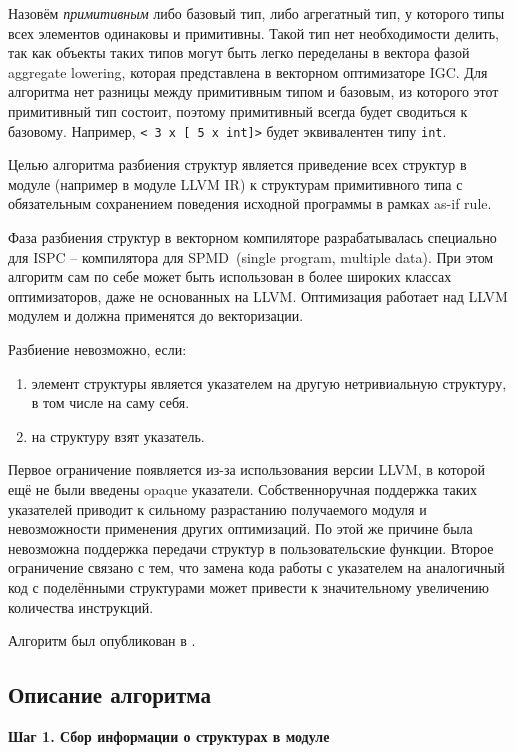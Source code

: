 Назовём \emph{примитивным} либо базовый тип, либо агрегатный тип, у которого типы всех элементов одинаковы и примитивны. Такой тип нет необходимости делить, так как объекты таких типов могут быть легко переделаны в вектора фазой aggregate lowering, которая представлена в векторном оптимизаторе IGC. Для алгоритма нет разницы между примитивным типом и базовым, из которого этот примитивный тип состоит, поэтому примитивный всегда будет сводиться к базовому. Например, \verb|< 3 x [ 5 x int]>| будет эквивалентен типу \verb|int|.

Целью алгоритма разбиения структур является приведение всех структур в модуле (например в модуле LLVM IR) к структурам примитивного типа с обязательным сохранением поведения исходной программы в рамках as-if rule.

Фаза разбиения структур в векторном компиляторе разрабатывалась специально для ISPC -- компилятора для SPMD~(single program, multiple data). При этом алгоритм сам по себе может быть использован в более широких классах оптимизаторов, даже не основанных на LLVM. Оптимизация работает над LLVM модулем и должна применятся до векторизации.

Разбиение невозможно, если:
\begin{enumerate}
\item элемент структуры является указателем на другую нетривиальную структуру, в том числе на саму себя.
\item на структуру взят указатель.
\end{enumerate}

Первое ограничение появляется из-за использования версии LLVM, в которой ещё не были введены opaque указатели.
Собственноручная поддержка таких указателей приводит к сильному разрастанию получаемого модуля и невозможности применения других оптимизаций.
По этой же причине была невозможна поддержка передачи структур в пользовательские функции.
Второе ограничение связано с тем, что замена кода работы с указателем на аналогичный код с поделёнными структурами может привести к значительному увеличению количества инструкций.

Алгоритм был опубликован в \cite{vladimirov2022opt2}.

\subsection{Описание алгоритма}\label{subsec:lowering/splitter/algorithm}

\textbf{Шаг 1. Сбор информации о структурах в модуле}\\


